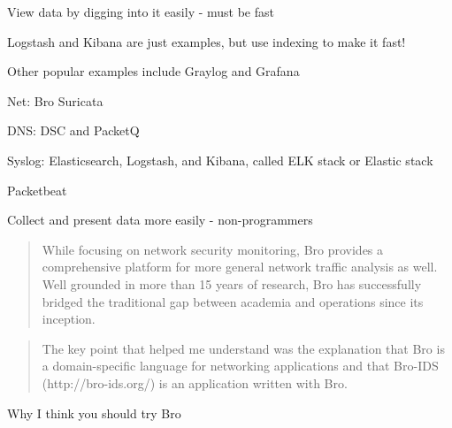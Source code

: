 \documentclass[20pt,landscape,a4paper,footrule]{foils}
\begin{document}


\begin{list1}
\item View data by digging into it easily - must be fast
\item Logstash and Kibana are just examples, but use indexing to make it fast!
\item Other popular examples include Graylog and Grafana
\end{list1}


\begin{list1}
\item Net: Bro  Suricata 
\item DNS: DSC and PacketQ 
\item Syslog: Elasticsearch, Logstash, and Kibana, called ELK stack or Elastic stack
\item Packetbeat 
\end{list1}
\centerline{Collect and present data more easily - non-programmers}




\begin{quote}
While focusing on network security monitoring, Bro provides a comprehensive platform for more general network traffic analysis as well. Well grounded in more than 15 years of research, Bro has successfully bridged the traditional gap between academia and operations since its inception.
\end{quote}



\begin{quote}
	The key point that helped me understand was the explanation that Bro is a
               domain-specific language for networking applications and that Bro-IDS
               (http://bro-ids.org/) is an application written with Bro.
\end{quote}

Why I think you should try Bro\\
\\
\end{document}
